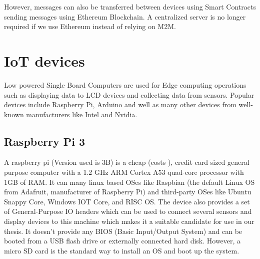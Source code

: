 \documentclass[11pt,openright]{report}
\begin{document}
However, messages can also be transferred between devices using Smart Contracts sending messages using Ethereum Blockchain. A centralized server is no longer required if we use Ethereum instead of relying on M2M.

\section{IoT devices}
Low powered Single Board Computers are used for Edge computing operations such as displaying data to LCD devices and collecting data from sensors. Popular devices include Raspberry Pi, Arduino and well as many other devices from well-known manufacturers like Intel and Nvidia.

\subsection{Raspberry Pi 3}
A raspberry pi (Version used is 3B) is a cheap (costs ), credit card sized general purpose computer with a 1.2 GHz ARM Cortex A53 quad-core processor with 1GB of RAM. It can many linux based OSes like Raspbian (the default Linux OS from Adafruit, manufacturer of Raspberry Pi) and third-party OSes like Ubuntu Snappy Core, Windows IOT Core, and RISC OS. The device also provides a set of General-Purpose IO headers which can be used to connect several sensors and display devices to this machine which makes it a suitable candidate for use in our thesis. It doesn't provide any BIOS (Basic Input/Output System) and can be booted from a USB flash drive or externally connected hard disk. However, a micro SD card is the standard way to install an OS and boot up the system.  
\newline
\newline
\end{document}
